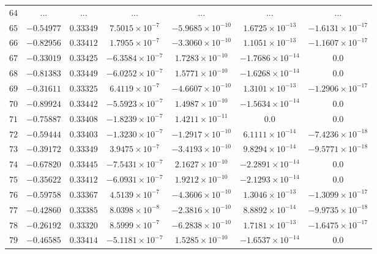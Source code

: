 \begin{landscape}
\begin{center}
\begin{longtable}{lcccccc}
$64$ & ... & ... & ... & ... & ... & ... \\
$65$ & $-0.54977$ & $0.33349$ & $7.5015\times{}10^{-7}$ & $-5.9685\times{}10^{-10}$ & $1.6725\times{}10^{-13}$ & $-1.6131\times{}10^{-17}$ \\
$66$ & $-0.82956$ & $0.33412$ & $1.7955\times{}10^{-7}$ & $-3.3060\times{}10^{-10}$ & $1.1051\times{}10^{-13}$ & $-1.1607\times{}10^{-17}$ \\
$67$ & $-0.33019$ & $0.33425$ & $-6.3584\times{}10^{-7}$ & $1.7283\times{}10^{-10}$ & $-1.7686\times{}10^{-14}$ & $0.0$ \\
$68$ & $-0.81383$ & $0.33449$ & $-6.0252\times{}10^{-7}$ & $1.5771\times{}10^{-10}$ & $-1.6268\times{}10^{-14}$ & $0.0$ \\
$69$ & $-0.31611$ & $0.33325$ & $6.4119\times{}10^{-7}$ & $-4.6607\times{}10^{-10}$ & $1.3101\times{}10^{-13}$ & $-1.2906\times{}10^{-17}$ \\
$70$ & $-0.89924$ & $0.33442$ & $-5.5923\times{}10^{-7}$ & $1.4987\times{}10^{-10}$ & $-1.5634\times{}10^{-14}$ & $0.0$ \\
$71$ & $-0.75887$ & $0.33408$ & $-1.8239\times{}10^{-7}$ & $1.4211\times{}10^{-11}$ & $0.0$ & $0.0$ \\
$72$ & $-0.59444$ & $0.33403$ & $-1.3230\times{}10^{-7}$ & $-1.2917\times{}10^{-10}$ & $6.1111\times{}10^{-14}$ & $-7.4236\times{}10^{-18}$ \\
$73$ & $-0.39172$ & $0.33349$ & $3.9475\times{}10^{-7}$ & $-3.4193\times{}10^{-10}$ & $9.8294\times{}10^{-14}$ & $-9.5771\times{}10^{-18}$ \\
$74$ & $-0.67820$ & $0.33445$ & $-7.5431\times{}10^{-7}$ & $2.1627\times{}10^{-10}$ & $-2.2891\times{}10^{-14}$ & $0.0$ \\
$75$ & $-0.35622$ & $0.33412$ & $-6.0931\times{}10^{-7}$ & $1.9212\times{}10^{-10}$ & $-2.1293\times{}10^{-14}$ & $0.0$ \\
$76$ & $-0.59758$ & $0.33367$ & $4.5139\times{}10^{-7}$ & $-4.3606\times{}10^{-10}$ & $1.3046\times{}10^{-13}$ & $-1.3099\times{}10^{-17}$ \\
$77$ & $-0.42860$ & $0.33385$ & $8.0398\times{}10^{-8}$ & $-2.3816\times{}10^{-10}$ & $8.8892\times{}10^{-14}$ & $-9.9735\times{}10^{-18}$ \\
$78$ & $-0.26192$ & $0.33320$ & $8.5999\times{}10^{-7}$ & $-6.2838\times{}10^{-10}$ & $1.7181\times{}10^{-13}$ & $-1.6475\times{}10^{-17}$ \\
$79$ & $-0.46585$ & $0.33414$ & $-5.1181\times{}10^{-7}$ & $1.5285\times{}10^{-10}$ & $-1.6537\times{}10^{-14}$ & $0.0$ \\

\end{longtable}
\end{center}
\end{landscape}

